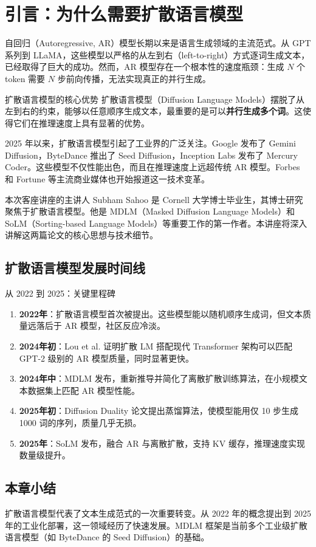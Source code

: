 \section{引言：为什么需要扩散语言模型}

自回归（Autoregressive, AR）模型长期以来是语言生成领域的主流范式。从 GPT 系列到 LLaMA，这些模型以严格的从左到右（left-to-right）方式逐词生成文本，已经取得了巨大的成功。然而，AR 模型存在一个根本性的速度瓶颈：生成 $N$ 个 token 需要 $N$ 步前向传播，无法实现真正的并行生成。

\begin{importantbox}{扩散语言模型的核心优势}
扩散语言模型（Diffusion Language Models）摆脱了从左到右的约束，能够以任意顺序生成文本，最重要的是可以\textbf{并行生成多个词}。这使得它们在推理速度上具有显著的优势。
\end{importantbox}

2025 年以来，扩散语言模型引起了工业界的广泛关注。Google 发布了 Gemini Diffusion，ByteDance 推出了 Seed Diffusion，Inception Labs 发布了 Mercury Coder。这些模型不仅性能出色，而且在推理速度上远超传统 AR 模型。Forbes 和 Fortune 等主流商业媒体也开始报道这一技术变革。

本次客座讲座的主讲人 Subham Sahoo 是 Cornell 大学博士毕业生，其博士研究聚焦于扩散语言模型。他是 MDLM（Masked Diffusion Language Models）和 SoLM（Sorting-based Language Models）等重要工作的第一作者。本讲座将深入讲解这两篇论文的核心思想与技术细节。

\subsection{扩散语言模型发展时间线}

\begin{knowledgebox}{从 2022 到 2025：关键里程碑}
\begin{enumerate}
    \item \textbf{2022年}：扩散语言模型首次被提出。这些模型能以随机顺序生成词，但文本质量远落后于 AR 模型，社区反应冷淡。
    \item \textbf{2024年初}：Lou et al. 证明扩散 LM 搭配现代 Transformer 架构可以匹配 GPT-2 级别的 AR 模型质量，同时显著更快。
    \item \textbf{2024年中}：MDLM 发布，重新推导并简化了离散扩散训练算法，在小规模文本数据集上匹配 AR 模型性能。
    \item \textbf{2025年初}：Diffusion Duality 论文提出蒸馏算法，使模型能用仅 10 步生成 1000 词的序列，质量几乎无损。
    \item \textbf{2025年}：SoLM 发布，融合 AR 与离散扩散，支持 KV 缓存，推理速度实现数量级提升。
\end{enumerate}
\end{knowledgebox}

\subsection{本章小结}

扩散语言模型代表了文本生成范式的一次重要转变。从 2022 年的概念提出到 2025 年的工业化部署，这一领域经历了快速发展。MDLM 框架是当前多个工业级扩散语言模型（如 ByteDance 的 Seed Diffusion）的基础。

\newpage
